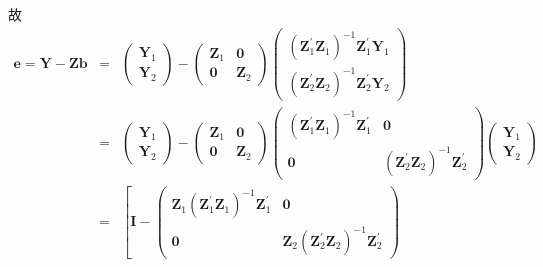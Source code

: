 		故		
		\begin{eqnarray*}
			\boldsymbol{e}=\boldsymbol{Y}-\boldsymbol{Zb} & = & \left(\begin{array}{c}
				\boldsymbol{Y}_{1} \\
				\boldsymbol{Y}_{2}
			\end{array}\right)-\left(\begin{array}{cc}
				\boldsymbol{Z}_{1} & \boldsymbol{0} \\
				\boldsymbol{0} & \boldsymbol{Z}_{2}
			\end{array}\right)\left(\begin{array}{c}
				\left(\boldsymbol{Z}_{1}^{\prime} \boldsymbol{Z}_{1}\right)^{-1} \boldsymbol{Z}_{1}^{\prime} \boldsymbol{Y}_{1} \\
				\left(\boldsymbol{Z}_{2}^{\prime} \boldsymbol{Z}_{2}\right)^{-1} \boldsymbol{Z}_{2}^{\prime} \boldsymbol{Y}_{2}
			\end{array}\right) \\
			& = & \left(\begin{array}{c}
				\boldsymbol{Y}_{1} \\
				\boldsymbol{Y}_{2}
			\end{array}\right)-\left(\begin{array}{cc}
				\boldsymbol{Z}_{1} & \boldsymbol{0} \\
				\boldsymbol{0} & \boldsymbol{Z}_{2}
			\end{array}\right)\left(\begin{array}{cc}
				\left(\boldsymbol{Z}_{1}^{\prime} \boldsymbol{Z}_{1}\right)^{-1} \boldsymbol{Z}_{1}^{\prime} & \boldsymbol{0} \\
				\boldsymbol{0} & \left(\boldsymbol{Z}_{2}^{\prime} \boldsymbol{Z}_{2}\right)^{-1} \boldsymbol{Z}_{2}^{\prime}
			\end{array}\right)\left(\begin{array}{c}
				\boldsymbol{Y}_{1} \\
				\boldsymbol{Y}_{2}
			\end{array}\right) \\
			& = & \left[\boldsymbol{I}-\left(\begin{array}{cc}
				\boldsymbol{Z}_{1}\left(\boldsymbol{Z}_{1}^{\prime} \boldsymbol{Z}_{1}\right)^{-1} \boldsymbol{Z}_{1}^{\prime} & \boldsymbol{0} \\
				\boldsymbol{0} & \boldsymbol{Z}_{2}\left(\boldsymbol{Z}_{2}^{\prime} \boldsymbol{Z}_{2}\right)^{-1} \boldsymbol{Z}_{2}^{\prime}
			\end{array}\right)

\end{eqnarray*}
